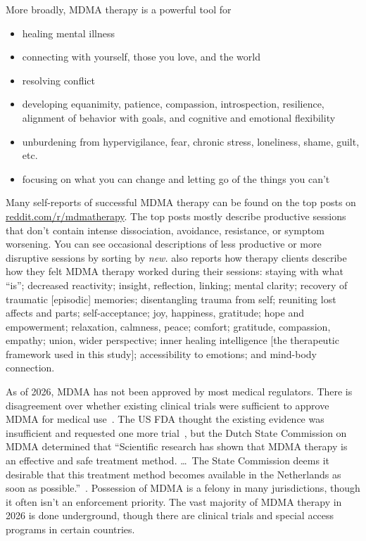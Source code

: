 \documentclass[11pt,oneside]{book}
\let\cite\parencite
\newcommand{\mdcite}[1]{}
\begin{document}
More broadly, MDMA therapy is a powerful tool for
\begin{itemize}
    \item healing mental illness
    \item connecting with yourself, those you love, and the world
    \item resolving conflict
    \item developing equanimity, patience, compassion, introspection, resilience, alignment of behavior with goals, and cognitive and emotional flexibility
    \item unburdening from hypervigilance, fear, chronic stress, loneliness, shame, guilt, etc.
    \item focusing on what you can change and letting go of the things you can't
\end{itemize}

Many self-reports of successful MDMA therapy can be found on the top posts on \href{https://reddit.com/r/mdmatherapy/top/?sort=top&t=all}{reddit.com/r/mdmatherapy}. The top posts mostly describe productive sessions that don't contain intense dissociation, avoidance, resistance, or symptom worsening. You can see occasional descriptions of less productive or more disruptive sessions by sorting by \textit{new.} \textcite{godes2023perceived} also reports how therapy clients describe how they felt MDMA therapy worked during their sessions: staying with what \enquote{is}; decreased reactivity; insight, reflection, linking; mental clarity; recovery of traumatic [episodic] memories; disentangling trauma from self; reuniting lost affects and parts; self-acceptance; joy, happiness, gratitude; hope and empowerment; relaxation, calmness, peace; comfort; gratitude, compassion, empathy; union, wider perspective; inner healing intelligence [the therapeutic framework used in this study]; accessibility to emotions; and mind-body connection.

As of 2026, MDMA has not been approved by most medical regulators. There is disagreement over whether existing clinical trials were sufficient to approve MDMA for medical use~\mdcite{fdaVSdutch}. The US FDA thought the existing evidence was insufficient and requested one more trial~\mdcite{crlAlpha}, but the Dutch State Commission on MDMA determined that \enquote{Scientific research has shown that MDMA therapy is an effective and safe treatment method. \dots\ The State Commission deems it desirable that this treatment method becomes available in the Netherlands as soon as possible.}~\cite[p. 203]{netherlandsMDMA}. Possession of MDMA is a felony in many jurisdictions, though it often isn't an enforcement priority. The vast majority of MDMA therapy in 2026 is done underground, though there are clinical trials and special access programs in certain countries.
\end{document}
